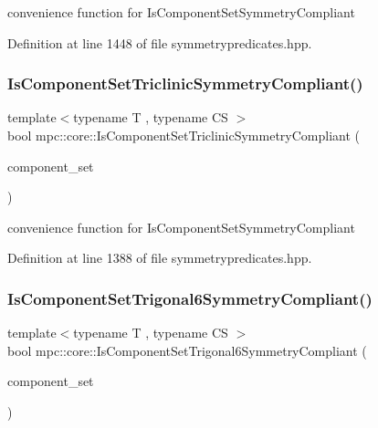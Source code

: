 convenience function for Is\+Component\+Set\+Symmetry\+Compliant 



Definition at line 1448 of file symmetrypredicates.\+hpp.

\mbox{\label{namespacempc_1_1core_a3112d520d8ca2505f59481a872c173e2}} 
\subsubsection{\texorpdfstring{Is\+Component\+Set\+Triclinic\+Symmetry\+Compliant()}{IsComponentSetTriclinicSymmetryCompliant()}}
{\footnotesize\ttfamily template$<$typename T , typename CS $>$ \\
bool mpc\+::core\+::\+Is\+Component\+Set\+Triclinic\+Symmetry\+Compliant (\begin{DoxyParamCaption}\item[{const std\+::set$<$ \mbox{\hyperlink{namespacempc_1_1core_ac3a232afc7c680d580628e834030482f}{mpc\+::core\+::\+Tensor\+Rank4\+Component}}$<$ T $>$ $>$ \&}]{component\+\_\+set }\end{DoxyParamCaption})}



convenience function for Is\+Component\+Set\+Symmetry\+Compliant 



Definition at line 1388 of file symmetrypredicates.\+hpp.

\mbox{\label{namespacempc_1_1core_affdfa075c30cf1356eb98c6eb625e8f8}} 
\subsubsection{\texorpdfstring{Is\+Component\+Set\+Trigonal6\+Symmetry\+Compliant()}{IsComponentSetTrigonal6SymmetryCompliant()}}
{\footnotesize\ttfamily template$<$typename T , typename CS $>$ \\
bool mpc\+::core\+::\+Is\+Component\+Set\+Trigonal6\+Symmetry\+Compliant (\begin{DoxyParamCaption}\item[{const std\+::set$<$ \mbox{\hyperlink{namespacempc_1_1core_ac3a232afc7c680d580628e834030482f}{mpc\+::core\+::\+Tensor\+Rank4\+Component}}$<$ T $>$ $>$ \&}]{component\+\_\+set }\end{DoxyParamCaption})}



